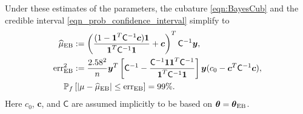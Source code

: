 \documentclass{svjour3}                     %
\newcommand{\bm}[1]{\boldsymbol{#1}}
\newcommand{\vtheta}{{\bm{\theta}}}
\newcommand{\vc}{\bm{c}}
\newcommand{\vy}{\bm{y}}
\newcommand{\vone}{\bm{1}}
\newcommand{\mC}{\mathsf{C}}
\newcommand{\mCInv}{\mathsf{C}^{-1}}
\newcommand{\hmu}{\widehat{\mu}}
\newcommand{\MLE}{\textup{EB}}
\newcommand{\err}{\textup{err}}
\begin{document}
Under these estimates of the parameters, the cubature \eqref{eqn:BayesCub} and the credible interval \eqref{eqn_prob_confidence_interval} simplify to 
\begin{align} %
\nonumber
\hmu_\MLE  &:= 
\left(
\frac{ (1 - \vone^T  \mCInv\vc )  \vone }{ \vone^T \mCInv \vone}   +  \vc 
\right)^T  \mCInv \vy, \\
\nonumber
\err_\MLE^2 & : = \frac{2.58^2}{n}
\vy^T \left[ \mCInv - 
\frac{ \mCInv \vone \vone^T \mCInv }{\vone^T\mCInv \vone}
\right] \vy  
(c_0 - \vc^T\mC^{-1}\vc ), \\
\label{eqn_prob_CI_MLE}
\mathbb{P}_f &\left[
|\mu-\hmu_\MLE| \leq \err_\MLE \right]  = 99\%.
\end{align}
Here $c_0$, $\vc$, and $\mC$ are assumed implicitly to be based on $\vtheta = \vtheta_\MLE$.   
\end{document}
